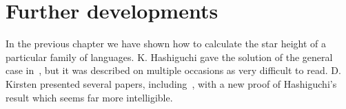 \chapter{Further developments}

In the previous chapter we have shown how to calculate the star height of a particular family of languages. K. Hashiguchi gave the solution of the general case in~\cite{Hashiguchi1990}, but it was described on multiple occasions as very difficult to read. D. Kirsten presented several papers, including~\cite{Kirsten05}, with a new proof of Hashiguchi's result which seems far more intelligible.
